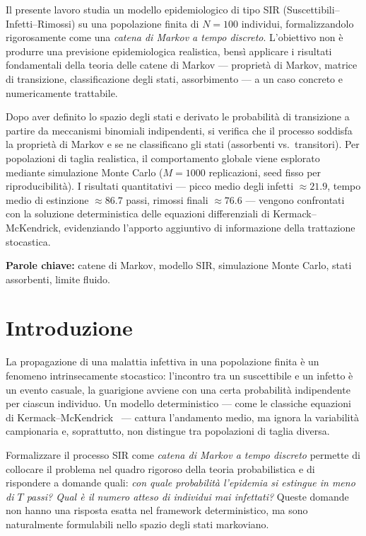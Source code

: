 \documentclass[11pt, a4paper]{article}
\theoremstyle{plain}
\theoremstyle{definition}
\theoremstyle{remark}
\begin{document}
Il presente lavoro studia un modello epidemiologico di tipo SIR (Suscettibili–Infetti–Rimossi) su
una popolazione finita di $N = 100$ individui, formalizzandolo rigorosamente come una
\emph{catena di Markov a tempo discreto}. L'obiettivo non è produrre una previsione epidemiologica
realistica, bensì applicare i risultati fondamentali della teoria delle catene di Markov —
proprietà di Markov, matrice di transizione, classificazione degli stati, assorbimento —
a un caso concreto e numericamente trattabile.

Dopo aver definito lo spazio degli stati e derivato le probabilità di transizione a partire da
meccanismi binomiali indipendenti, si verifica che il processo soddisfa la proprietà di Markov
e se ne classificano gli stati (assorbenti vs.\ transitori). Per popolazioni di taglia realistica,
il comportamento globale viene esplorato mediante simulazione Monte Carlo ($M = 1000$
replicazioni, seed fisso per riproducibilità). I risultati quantitativi — picco medio degli infetti
$\approx 21.9$, tempo medio di estinzione $\approx 86.7$ passi, rimossi finali $\approx 76.6$ —
vengono confrontati con la soluzione deterministica delle equazioni differenziali di
Kermack--McKendrick, evidenziando l'apporto aggiuntivo di informazione della trattazione
stocastica.

\bigskip
\noindent\textbf{Parole chiave:} catene di Markov, modello SIR, simulazione Monte Carlo,
stati assorbenti, limite fluido.

\newpage

\section{Introduzione}

La propagazione di una malattia infettiva in una popolazione finita è un fenomeno
intrinsecamente stocastico: l'incontro tra un suscettibile e un infetto è un evento casuale,
la guarigione avviene con una certa probabilità indipendente per ciascun individuo.
Un modello deterministico — come le classiche equazioni di Kermack--McKendrick~\cite{kermack1927} —
cattura l'andamento medio, ma ignora la variabilità campionaria e, soprattutto, non distingue
tra popolazioni di taglia diversa.

Formalizzare il processo SIR come \emph{catena di Markov a tempo discreto} permette di collocare
il problema nel quadro rigoroso della teoria probabilistica e di rispondere a domande quali:
\emph{con quale probabilità l'epidemia si estingue in meno di $T$ passi? Qual è il numero atteso
di individui mai infettati?} Queste domande non hanno una risposta esatta nel framework
deterministico, ma sono naturalmente formulabili nello spazio degli stati markoviano.
\end{document}
